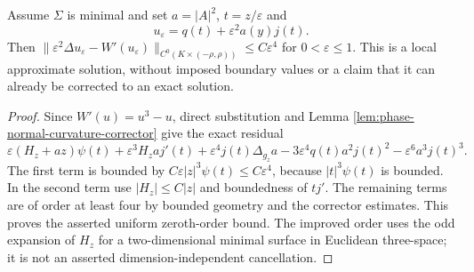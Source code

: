 \begin{proposition}\label{prop:phase-corrected-layer-residual}
Assume $\Sigma$ is minimal and set $a=|A|^2$, $t=z/\varepsilon$ and
\[
 u_\varepsilon=q(t)+\varepsilon^2a(y)j(t).
\]
Then $\|\varepsilon^2\Delta u_\varepsilon-W'(u_\varepsilon)\|_{C^0(K\times(-\rho,\rho))}
\leq C\varepsilon^4$ for $0<\varepsilon\leq1$.
This is a local approximate solution, without imposed boundary values or a claim that it can already be corrected to an exact solution.
\end{proposition}
\begin{proof}
Since $W'(u)=u^3-u$, direct substitution and Lemma \ref{lem:phase-normal-curvature-corrector} give the exact residual
\[
 \varepsilon(H_z+az)\psi(t)+
 \varepsilon^3H_z a j'(t)+\varepsilon^4j(t)\Delta_{g_z}a
 -3\varepsilon^4q(t)a^2j(t)^2-\varepsilon^6a^3j(t)^3.
\]
The first term is bounded by $C\varepsilon|z|^3\psi(t)\leq C\varepsilon^4$, because $|t|^3\psi(t)$ is bounded. In the second term use $|H_z|\leq C|z|$ and boundedness of $tj'$. The remaining terms are of order at least four by bounded geometry and the corrector estimates. This proves the asserted uniform zeroth-order bound. The improved order uses the odd expansion of $H_z$ for a two-dimensional minimal surface in Euclidean three-space; it is not an asserted dimension-independent cancellation.
\end{proof}

